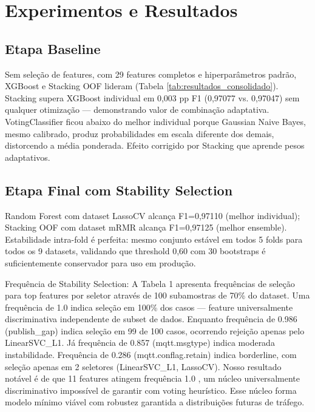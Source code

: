 \documentclass[12pt]{article}
\begin{document}
\section{Experimentos e Resultados}

\subsection{Etapa Baseline}

Sem seleção de features, com 29 features completos e hiperparâmetros padrão, XGBoost e Stacking OOF lideram (Tabela \ref{tab:resultados_consolidado}). Stacking supera XGBoost individual em 0,003 pp F1 (0,97077 vs. 0,97047) sem qualquer otimização — demonstrando valor de combinação adaptativa. VotingClassifier ficou abaixo do melhor individual porque Gaussian Naive Bayes, mesmo calibrado, produz probabilidades em escala diferente dos demais, distorcendo a média ponderada. Efeito corrigido por Stacking que aprende pesos adaptativos.

\subsection{Etapa Final com Stability Selection}

Random Forest com dataset LassoCV alcança F1=0,97110 (melhor individual); Stacking OOF com dataset mRMR alcança F1=0,97125 (melhor ensemble). Estabilidade intra-fold é perfeita: mesmo conjunto estável em todos 5 folds para todos os 9 datasets, validando que threshold 0,60 com 30 bootstraps é suficientemente conservador para uso em produção.

Frequência de Stability Selection: A Tabela 1 apresenta frequências de seleção para top features por seletor através de 100 subamostras de 70\% do dataset. Uma frequência de 1.0 indica seleção em 100\% dos casos — feature universalmente discriminativa independente de subset de dados. Enquanto frequência de 0.986 (publish\_gap) indica seleção em 99 de 100 casos, ocorrendo
rejeição apenas pelo LinearSVC\_L1. Já frequência de 0.857 (mqtt.msgtype) indica moderada instabilidade. Frequência de 0.286 (mqtt.conflag.retain) indica borderline, com seleção apenas em 2 seletores (LinearSVC\_L1, LassoCV). Nosso resultado notável é de
que 11 features atingem frequência 1.0 , um núcleo universalmente discriminativo impossível de garantir com voting heurístico. Esse núcleo forma modelo mínimo viável com robustez garantida a distribuições futuras de tráfego.
\end{document}
